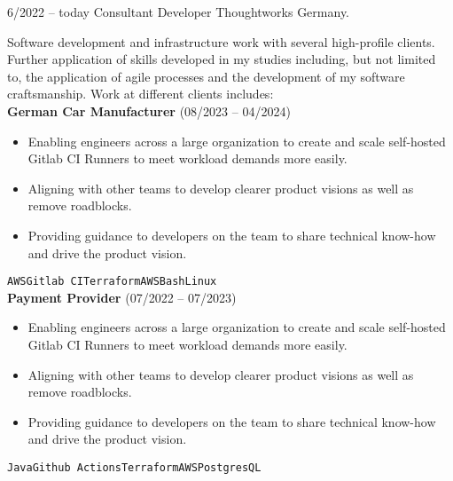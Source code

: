 \documentclass[9pt]{developercv} %
\begin{document}
\begin{entrylist}
	\entry
		{6/2022 -- today}
		{Consultant Developer}
		{Thoughtworks Germany.}
		{Software development and infrastructure work with several high-profile clients. Further application of skills developed in my studies including, but not limited to, the application of agile processes and the development of my software craftsmanship. Work at different clients includes:\\

        \textbf{German Car Manufacturer} {\footnotesize(08/2023 -- 04/2024)}
        \begin{itemize}
            \item Enabling engineers across a large organization to create and scale self-hosted Gitlab CI Runners to meet workload demands more easily.
            \item Aligning with other teams to develop clearer product visions as well as remove roadblocks.
            \item Providing guidance to developers on the team to share technical know-how and drive the product vision.
        \end{itemize}
  \texttt{AWS}\slashsep\texttt{Gitlab CI}\slashsep\texttt{Terraform}\slashsep\texttt{AWS}\slashsep\texttt{Bash}\slashsep\texttt{Linux}\\
  
        \textbf{Payment Provider} {\footnotesize(07/2022 -- 07/2023)}
        \begin{itemize}
            \item Enabling engineers across a large organization to create and scale self-hosted Gitlab CI Runners to meet workload demands more easily.
            \item Aligning with other teams to develop clearer product visions as well as remove roadblocks.
            \item Providing guidance to developers on the team to share technical know-how and drive the product vision.
        \end{itemize}
  \texttt{Java}\slashsep\texttt{Github Actions}\slashsep\texttt{Terraform}\slashsep\texttt{AWS}\slashsep\texttt{PostgresQL}
  
}
\end{entrylist}
\end{document}
